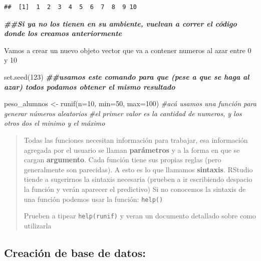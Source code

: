 \documentclass[
]{book}
\newenvironment{Shaded}{\begin{snugshade}}{\end{snugshade}}
\newcommand{\AttributeTok}[1]{\textcolor[rgb]{0.77,0.63,0.00}{#1}}
\newcommand{\CommentTok}[1]{\textcolor[rgb]{0.56,0.35,0.01}{\textit{#1}}}
\newcommand{\DecValTok}[1]{\textcolor[rgb]{0.00,0.00,0.81}{#1}}
\newcommand{\DocumentationTok}[1]{\textcolor[rgb]{0.56,0.35,0.01}{\textbf{\textit{#1}}}}
\newcommand{\FunctionTok}[1]{\textcolor[rgb]{0.00,0.00,0.00}{#1}}
\newcommand{\NormalTok}[1]{#1}
\newcommand{\OtherTok}[1]{\textcolor[rgb]{0.56,0.35,0.01}{#1}}
\begin{document}
\begin{verbatim}
##  [1]  1  2  3  4  5  6  7  8  9 10
\end{verbatim}

\begin{Shaded}
\begin{Highlighting}[]
\DocumentationTok{\#\#Si ya no los tienen en su ambiente, vuelvan a correr el código donde los creamos anteriormente}
\end{Highlighting}
\end{Shaded}

Vamos a crear un nuevo objeto vector que va a contener numeros al azar entre 0 y 10

\begin{Shaded}
\begin{Highlighting}[]
\FunctionTok{set.seed}\NormalTok{(}\DecValTok{123}\NormalTok{) }
\DocumentationTok{\#\#usamos este comando para que (pese a que se haga al azar) todos podamos obtener el mismo resultado}

\NormalTok{peso\_alumnos }\OtherTok{\textless{}{-}} \FunctionTok{runif}\NormalTok{(}\AttributeTok{n=}\DecValTok{10}\NormalTok{, }\AttributeTok{min=}\DecValTok{50}\NormalTok{, }\AttributeTok{max=}\DecValTok{100}\NormalTok{) }
\CommentTok{\#acá usamos una función para generar números aleatorios}
\CommentTok{\#el primer valor es la cantidad de numeros, y los otros dos el minimo y el máximo}
\end{Highlighting}
\end{Shaded}

\begin{quote}
Todas las funciones necesitan información para trabajar, esa información agregada por el usuario se llaman \textbf{parámetros} y a la forma en que se cargan \textbf{argumento}. Cada función tiene sus propias reglas (pero generalmente son parecidas). A esto es lo que llamamos \textbf{sintaxis}. RStudio tiende a sugerirnos la sintaxis necesaria (prueben a ir escribiendo despacio la función y verán aparecer el predictivo)
Si no conocemos la sintaxis de una función podemos usar la función: \texttt{help()}

Prueben a tipear \texttt{help(runif)} y veran un documento detallado sobre como utilizarla
\end{quote}

\hypertarget{creaciuxf3n-de-base-de-datos}{%
\subsection{Creación de base de datos:}\label{creaciuxf3n-de-base-de-datos}}
\end{document}
